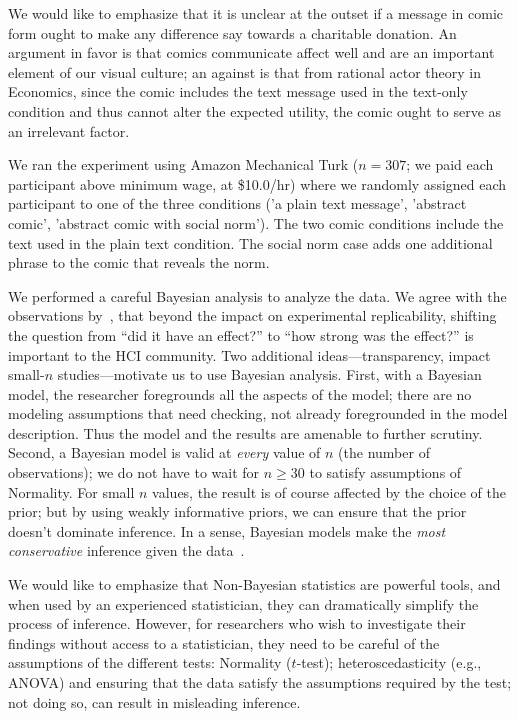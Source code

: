We would like to emphasize that it is unclear at the outset if a message in comic form ought to make any difference say towards a charitable donation. An argument in favor is that comics communicate affect well and are an important element of our visual culture; an against is that from rational actor theory in Economics, since the comic includes the text message used in the text-only condition and thus cannot alter the expected utility, the comic ought to serve as an irrelevant factor. 

We ran the experiment using Amazon Mechanical Turk ($n=307$; we paid each participant above minimum wage, at \$10.0/hr) where we randomly assigned each participant to one of the three conditions ('a plain text message', 'abstract comic', 'abstract comic with social norm'). The two comic conditions include the text used in the plain text condition. The social norm case adds one additional phrase to the comic that reveals the norm.

We performed a careful Bayesian analysis to analyze the data. We agree with the observations by~\textcite{Kay2016}, that beyond the impact on experimental replicability, shifting the question from ``did it have an effect?'' to ``how strong was the effect?'' is important to the HCI community. Two additional ideas---transparency, impact small-$n$ studies---motivate us to use Bayesian analysis. First, with a Bayesian model, the researcher foregrounds all the aspects of the model; there are no modeling assumptions that need checking, not already foregrounded in the model description. Thus the model and the results are amenable to further scrutiny. Second, a Bayesian model is valid at \textit{every} value of $n$ (the number of observations); we do not have to wait for $n\geq 30$ to satisfy assumptions of Normality. For small $n$ values, the result is of course affected by the choice of the prior; but by using weakly informative priors, we can ensure that the prior doesn't dominate inference. In a sense, Bayesian models make the \textit{most conservative} inference given the data~\textcite[][Chapter 9]{McElreath2015}.

We would like to emphasize that Non-Bayesian statistics are powerful tools, and when used by an experienced statistician, they can dramatically simplify the process of inference. However, for researchers who wish to investigate their findings without access to a statistician, they need to be careful of the assumptions of the different tests: Normality ($t$-test); heteroscedasticity (e.g., ANOVA) and ensuring that the data satisfy the assumptions required by the test; not doing so, can result in misleading inference.



